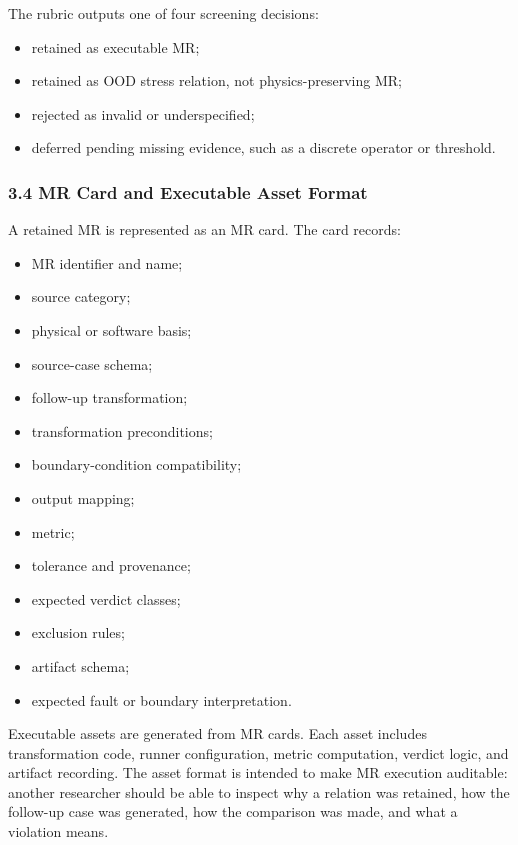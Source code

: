 The rubric outputs one of four screening decisions:

\begin{itemize}
\tightlist
\item
  retained as executable MR;
\item
  retained as OOD stress relation, not physics-preserving MR;
\item
  rejected as invalid or underspecified;
\item
  deferred pending missing evidence, such as a discrete operator or
  threshold.
\end{itemize}

\subsubsection{3.4 MR Card and Executable Asset
Format}\label{mr-card-and-executable-asset-format}

A retained MR is represented as an MR card. The card records:

\begin{itemize}
\tightlist
\item
  MR identifier and name;
\item
  source category;
\item
  physical or software basis;
\item
  source-case schema;
\item
  follow-up transformation;
\item
  transformation preconditions;
\item
  boundary-condition compatibility;
\item
  output mapping;
\item
  metric;
\item
  tolerance and provenance;
\item
  expected verdict classes;
\item
  exclusion rules;
\item
  artifact schema;
\item
  expected fault or boundary interpretation.
\end{itemize}

Executable assets are generated from MR cards. Each asset includes
transformation code, runner configuration, metric computation, verdict
logic, and artifact recording. The asset format is intended to make MR
execution auditable: another researcher should be able to inspect why a
relation was retained, how the follow-up case was generated, how the
comparison was made, and what a violation means.

